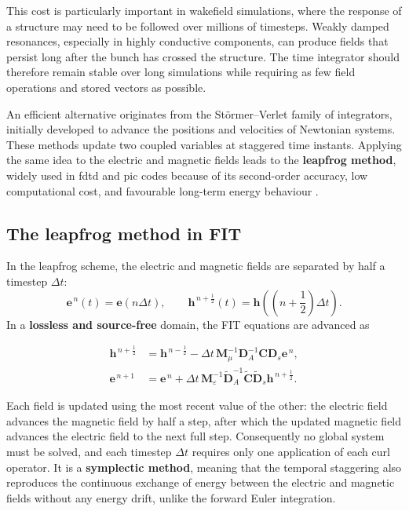 This cost is particularly important in wakefield simulations, where the response of a structure may need to be followed over millions of timesteps. Weakly damped resonances, especially in highly conductive components, can produce fields that persist long after the bunch has crossed the structure. The time integrator should therefore remain stable over long simulations while requiring as few field operations and stored vectors as possible.

An efficient alternative originates from the Störmer--Verlet family of integrators, initially developed to advance the positions and velocities of Newtonian systems. These methods update two coupled variables at staggered time instants. Applying the same idea to the electric and magnetic fields leads to the \textbf{leapfrog method}, widely used in \gls{fdtd} and \gls{pic} codes because of its second-order accuracy, low computational cost, and favourable long-term energy behaviour \cite{fedeli_pushing_2022, yee_numerical_1966, weilandFiniteIntegrationMethod2003}.

\subsection{The leapfrog method in FIT}
\label{sec:fit_leapfrog}

In the leapfrog scheme, the electric and magnetic fields are separated by half a timestep  $\Delta t$:
%
\begin{equation}
\mathbf{e}^{\,n}(t)=\mathbf{e}\left(n\Delta t\right),
\qquad
\mathbf{h}^{\,n+\frac{1}{2}}(t)
=
\mathbf{h}\left(\left(n+\frac{1}{2}\right)\Delta t\right).
\end{equation}
%
In a \textbf{lossless and source-free} domain, the FIT equations are advanced as

\begin{equation}
\boxed{
\begin{aligned}
\mathbf{h}^{\,n+\frac{1}{2}}
&=
\mathbf{h}^{\,n-\frac{1}{2}}
-\Delta t\,
\mathbf{M}_{\mu}^{-1}
\mathbf{D}_A^{-1}
\mathbf{C}\mathbf{D}_s\mathbf{e}^{\,n},
\\[3mm]
\mathbf{e}^{\,n+1}
&=
\mathbf{e}^{\,n}
+\Delta t\,
\mathbf{M}_{\varepsilon}^{-1}
\widetilde{\mathbf{D}}_A^{-1}
\widetilde{\mathbf{C}}\widetilde{\mathbf{D}}_s
\mathbf{h}^{\,n+\frac{1}{2}} .
\end{aligned}}
\label{eq:fit_leapfrog_lossless}
\end{equation}

Each field is updated using the most recent value of the other: the electric field advances the magnetic field by half a step, after which the updated magnetic field advances the electric field to the next full step. Consequently no global system must be solved, and each timestep $\Delta t$ requires only one application of each curl operator. It is a \textbf{symplectic method}, meaning that the temporal staggering also reproduces the continuous exchange of energy between the electric and magnetic fields without any energy drift, unlike the forward Euler integration.

